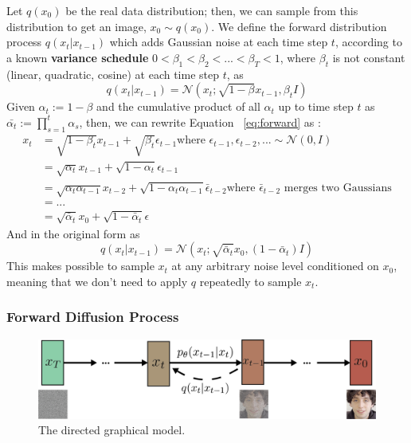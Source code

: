\documentclass[preprint]{elsarticle}
\begin{document}
Let $q(x_0)$ be the real data distribution; then, we can sample from this distribution to get an image, $x_0 \sim q(x_0)$. 
We define the forward distribution process $q(x_t|x_{t-1})$ which adds Gaussian noise at each time step $t$, 
according to a known \textbf{variance schedule} $0<\beta_1<\beta_2<...<\beta_T<1$, where $\beta_t$ 
is not constant (linear, quadratic, cosine) at each time step $t$, 
as
\begin{equation} \label{eq:forward}
	q(x_t|x_{t-1}) = \mathcal{N}(x_t; \sqrt{1-\beta}x_{t-1}, \beta_t I)
\end{equation}
Given $\alpha_t:=1-\beta$ and the cumulative product of all $\alpha_t$ up to time step $t$ as 
$\bar{\alpha_t} := \prod_{s=1}^t\alpha_s$, then, we can rewrite Equation ~\ref{eq:forward} as 
\cite{weng2021diffusion}:
\begin{equation}
	\begin{split}
		x_t & = \sqrt{1-\beta_t}x_{t-1} + \sqrt{\beta_t}\epsilon_{t-1}
		\text{where $\epsilon_{t-1},\epsilon_{t-2},... \sim \mathcal{N}(0,I)$}\\
		& = \sqrt{\alpha_t}x_{t-1} + \sqrt{1-\alpha_t}\epsilon_{t-1} \\
		& = \sqrt{\alpha_t\alpha_{t-1}}x_{t-2} + \sqrt{1-\alpha_t\alpha_{t-1}}\bar{\epsilon}_{t-2} 
		\text{where $\bar{\epsilon}_{t-2}$ merges two Gaussians}\\
		& = ... \\
		& = \sqrt{\bar{\alpha}_t}x_0 + \sqrt{1-\bar{\alpha}_t}\epsilon 
	\end{split}
\end{equation}
And in the original form as
\begin{equation} \label{eq:forward2}
	q(x_t|x_{t-1}) = \mathcal{N}(x_t; \sqrt{\bar{\alpha}_t}x_0, (1 -\bar{\alpha}_t) I)
\end{equation}
This makes possible to sample $x_t$ at any arbitrary noise level conditioned on $x_0$,
meaning that we don't need to apply $q$ repeatedly to sample $x_t$.


\subsubsection{Forward Diffusion Process}
\begin{figure}[b]
	\centering
	\includegraphics[scale=0.74, keepaspectratio]{img/background_img/Diffusion2.png}
	\caption{The directed graphical model.}\label{fig:m-chain}
\end{figure}
\end{document}
